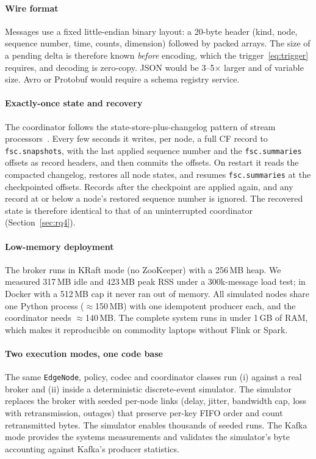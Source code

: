 \paragraph{Wire format} Messages use a fixed little-endian binary layout: a 20-byte header (kind, node, sequence number, time, counts, dimension) followed by packed arrays. The size of a pending delta is therefore known \emph{before} encoding, which the trigger~\eqref{eq:trigger} requires, and decoding is zero-copy. JSON would be 3--5$\times$ larger and of variable size. Avro or Protobuf would require a schema registry service.

\paragraph{Exactly-once state and recovery} The coordinator follows the state-store-plus-changelog pattern of stream processors~\cite{carbone2017flinkstate}. Every few seconds it writes, per node, a full CF record to \texttt{fsc.snapshots}, with the last applied sequence number and the \texttt{fsc.summaries} offsets as record headers, and then commits the offsets. On restart it reads the compacted changelog, restores all node states, and resumes \texttt{fsc.summaries} at the checkpointed offsets. Records after the checkpoint are applied again, and any record at or below a node's restored sequence number is ignored. The recovered state is therefore identical to that of an uninterrupted coordinator (Section~\ref{sec:rq4}).

\paragraph{Low-memory deployment} The broker runs in KRaft mode (no ZooKeeper) with a 256\,MB heap. We measured 317\,MB idle and 423\,MB peak RSS under a 300k-message load test; in Docker with a 512\,MB cap it never ran out of memory. All simulated nodes share one Python process ($\approx$150\,MB) with one idempotent producer each, and the coordinator needs $\approx$140\,MB. The complete system runs in under 1\,GB of RAM, which makes it reproducible on commodity laptops without Flink or Spark.

\paragraph{Two execution modes, one code base} The same \texttt{EdgeNode}, policy, codec and coordinator classes run (i) against a real broker and (ii) inside a deterministic discrete-event simulator. The simulator replaces the broker with seeded per-node links (delay, jitter, bandwidth cap, loss with retransmission, outages) that preserve per-key FIFO order and count retransmitted bytes. The simulator enables thousands of seeded runs. The Kafka mode provides the systems measurements and validates the simulator's byte accounting against Kafka's producer statistics.
